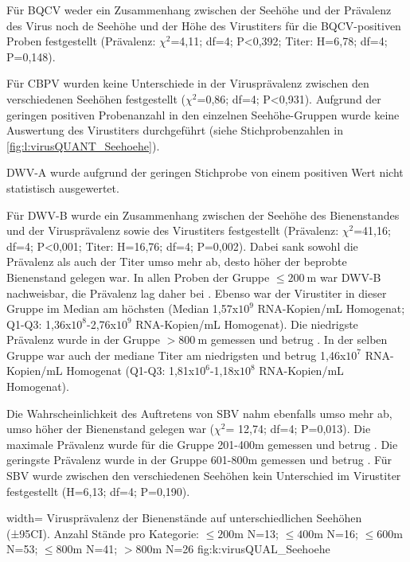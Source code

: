 Für BQCV weder ein Zusammenhang zwischen der Seehöhe und der Prävalenz des Virus noch de Seehöhe und der Höhe des Virustiters für die BQCV-positiven Proben festgestellt (Prävalenz: $\chi^2$=4,11; df=4; P<0,392; Titer: H=6,78; df=4; P=0,148).


Für CBPV wurden keine Unterschiede in der Virusprävalenz zwischen den verschiedenen Seehöhen festgestellt ($\chi^2$=0,86; df=4; P<0,931). Aufgrund der geringen positiven Probenanzahl in den einzelnen Seehöhe-Gruppen wurde keine Auswertung des Virustiters durchgeführt (siehe Stichprobenzahlen in \cref{fig:l:virusQUANT_Seehoehe}).


DWV-A wurde aufgrund der geringen Stichprobe von einem positiven Wert nicht statistisch ausgewertet.


Für DWV-B wurde ein Zusammenhang zwischen der Seehöhe des Bienenstandes und der Virusprävalenz sowie des Virustiters festgestellt (Prävalenz: $\chi^2$=41,16; df=4; P<0,001; Titer: H=16,76; df=4; P=0,002). Dabei sank sowohl die Prävalenz als auch der Titer umso mehr ab, desto höher der beprobte Bienenstand gelegen war. In allen Proben der Gruppe $\leq \SI{200}{\meter}$ war DWV-B nachweisbar, die Prävalenz lag daher bei . Ebenso war der Virustiter in dieser Gruppe im Median am höchsten (Median 1,57x$10^9$ RNA-Kopien/\si{\milli\liter} Homogenat; Q1-Q3: 1,36x$10^8$-2,76x$10^9$ RNA-Kopien/\si{\milli\liter} Homogenat). Die niedrigste Prävalenz wurde in der Gruppe $> \SI{800}{\meter}$ gemessen und betrug . In der selben Gruppe war auch der mediane Titer am niedrigsten und betrug 1,46x$10^7$ RNA-Kopien/\si{\milli\liter} Homogenat (Q1-Q3: 1,81x$10^6$-1,18x$10^8$ RNA-Kopien/\si{\milli\liter} Homogenat).


Die Wahrscheinlichkeit des Auftretens von SBV nahm ebenfalls umso mehr ab, umso höher der Bienenstand gelegen war ($\chi^2$= 12,74; df=4; P=0,013). Die maximale Prävalenz wurde für die Gruppe 201-400\si{\meter} gemessen und betrug . Die geringste Prävalenz wurde in der Gruppe 601-800\si{\meter} gemessen und betrug . Für SBV wurde zwischen den verschiedenen Seehöhen kein Unterschied im Virustiter  festgestellt (H=6,13; df=4; P=0,190).

 
 
  {width=\textwidth} %
  {Virusprävalenz der Bienenstände auf unterschiedlichen Seehöhen (±95CI). Anzahl Stände pro Kategorie: $\leq200\si{\m}$ N=13; $\leq400\si{\m}$ N=16; $\leq600\si{\m}$ N=53; $\leq800\si{\m}$ N=41; $>800\si{\m}$ N=26} %
  {} %
  {fig:k:virusQUAL_Seehoehe} %
 
